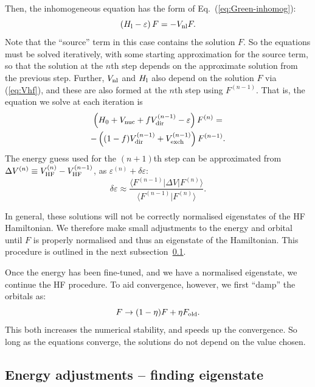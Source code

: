 \documentclass[10pt,twocolumn,a4paper]{article}%
\newcommand{\bra}[1]{\ensuremath{\langle #1|}}	%
\newcommand{\ket}[1]{\ensuremath{|#1\rangle}}	%
\newcommand{\braket}[1]{\ensuremath{\langle #1\rangle}}	%
\newcommand{\be}{\begin{equation}}
\newcommand{\ee}{\end{equation}}
\def\en{\ensuremath{\varepsilon}}
\begin{document}
Then, the inhomogeneous equation has the form of Eq.~(\ref{eq:Green-inhomog}):
\be
\left( H_{\rm l}- \en\right)F = -V_{\rm nl}F.
\ee
Note that the ``source'' term in this case contains the solution $F$. 
So the equations must be solved iteratively, with some starting approximation for the source term, so that the solution at the $n$th step depends on the approximate solution from the previous step.
Further, $V_{\rm nl}$ and $H_{\rm l}$ also depend on the solution $F$ via (\ref{eq:Vhf}), and these are also formed at the $n$th step using $F^{(n-1)}$.
That is, the equation we solve at each iteration is
\begin{multline}\label{eq:inhomog-HF}
\left( H_0 + V_{\rm nuc} + fV_{\rm dir}^{(n-1)} - \en\right)F^{(n)} =
\\
 -\left( (1-f)V_{\rm dir}^{(n-1)}+V_{\rm exch}^{(n-1)} \right)F^{(n-1)}.
\end{multline}
%
The energy guess used for the $(n+1)$th step can be approximated from $\Delta V^{(n)} \equiv V_{\rm HF}^{(n)} - V_{\rm HF}^{(n-1)}$, as $\en^{(n)}+\delta\en$:
\be
\delta\en \approx  \frac{\bra{F^{(n-1)}} \Delta V \ket{F^{(n)}}}{\braket{F^{(n-1)}|F^{(n)}}}.
\ee


In general, these solutions will not be correctly normalised eigenstates of the HF Hamiltonian.
We therefore make small adjustments to the energy and orbital until $F$ is properly normalised and thus an eigenstate of the Hamiltonian. 
This procedure is outlined in the next subsection~\ref{sec:hf-adjustEn}.

Once the energy has been fine-tuned, and we have a normalised eigenstate, we continue the HF procedure.
To aid convergence, however, we first ``damp'' the orbitals as:
\be
F \to (1-\eta)F+ \eta F_{\rm old}.
\ee
This both increases the numerical stability, and speeds up the convergence. 
So long as the equations converge, the solutions do not depend on the value chosen.



\subsection{Energy adjustments -- finding eigenstate}\label{sec:hf-adjustEn}
\end{document}

